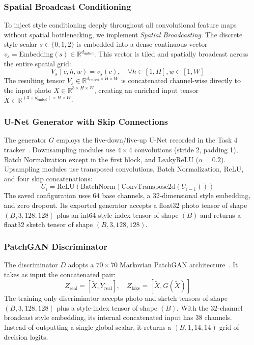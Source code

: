 \documentclass[journal,compsoc]{IEEEtran}
\begin{document}
\subsubsection{Spatial Broadcast Conditioning}
To inject style conditioning deeply throughout all convolutional feature maps without spatial bottlenecking, we implement \textit{Spatial Broadcasting}. The discrete style scalar $s \in \{0, 1, 2\}$ is embedded into a dense continuous vector $v_s = \text{Embedding}(s) \in \mathbb{R}^{d_{\text{embed}}}$. This vector is tiled and spatially broadcast across the entire spatial grid:
\begin{equation}
    V_s(c, h, w) = v_s(c), \quad \forall h \in [1, H], w \in [1, W]
\end{equation}
The resulting tensor $V_s \in \mathbb{R}^{d_{\text{embed}} \times H \times W}$ is concatenated channel-wise directly to the input photo $X \in \mathbb{R}^{3 \times H \times W}$, creating an enriched input tensor $\tilde{X} \in \mathbb{R}^{(3 + d_{\text{embed}}) \times H \times W}$.

\subsubsection{U-Net Generator with Skip Connections}
The generator $G$ employs the five-down/five-up U-Net recorded in the Task 4 tracker~\cite{ronneberger2015u}. Downsampling modules use $4 \times 4$ convolutions (stride 2, padding 1), Batch Normalization except in the first block, and LeakyReLU ($\alpha = 0.2$). Upsampling modules use transposed convolutions, Batch Normalization, ReLU, and four skip concatenations:
\begin{equation}
    U_i = \text{ReLU}(\text{BatchNorm}(\text{ConvTranspose2d}(U_{i-1})))
\end{equation}
The saved configuration uses 64 base channels, a 32-dimensional style embedding, and zero dropout. Its exported generator accepts a float32 photo tensor of shape $(B,3,128,128)$ plus an int64 style-index tensor of shape $(B)$ and returns a float32 sketch tensor of shape $(B,3,128,128)$.

\subsubsection{PatchGAN Discriminator}
The discriminator $D$ adopts a $70 \times 70$ Markovian PatchGAN architecture~\cite{isola2017image, li2016precomputed}. It takes as input the concatenated pair:
\begin{equation}
    Z_{\text{real}} = [\tilde{X}, Y_{\text{real}}], \quad Z_{\text{fake}} = [\tilde{X}, G(\tilde{X})]
\end{equation}
The training-only discriminator accepts photo and sketch tensors of shape $(B,3,128,128)$ plus a style-index tensor of shape $(B)$. With the 32-channel broadcast style embedding, its internal concatenated input has 38 channels. Instead of outputting a single global scalar, it returns a $(B,1,14,14)$ grid of decision logits.
\end{document}
